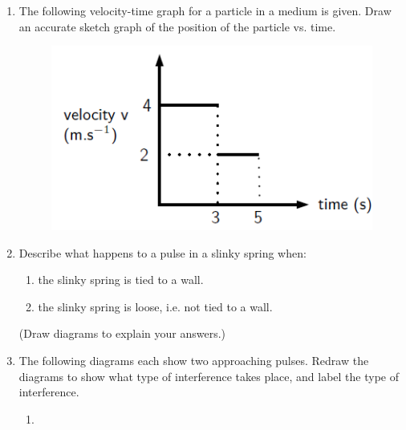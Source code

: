 \begin{enumerate}[noitemsep, label=\textbf{\arabic*}. ]
\begin{figure}[H]
\begin{center}
      \vspace{2pt}
    \vspace{.1in}
    \end{center}
 \end{figure}               \label{m38802*uid75}\item The following velocity-time graph for a particle in a medium is given. Draw an accurate sketch graph of the position of the particle vs. time.
    \setcounter{subfigure}{0}
	\begin{figure}[H] %
    \begin{center}
    \label{m38802*id316826!!!underscore!!!media}\label{m38802*id316826!!!underscore!!!printimage}\includegraphics[width=0.5\columnwidth]{col11305.imgs/m38802_PG10C4_031.png} %
      \vspace{2pt}
    \vspace{.1in}
    \end{center}
 \end{figure}               \label{m38802*uid76}\item Describe what happens to a pulse in a slinky spring when:
\label{m38802*id316845}\begin{enumerate}[noitemsep, label=\textbf{\alph*}. ] 
            \label{m38802*uid77}\item the slinky spring is tied to a wall.
\label{m38802*uid78}\item the slinky spring is loose, i.e. not tied to a wall.
\end{enumerate}
(Draw diagrams to explain your answers.)\newline
\label{m38802*uid79}\item The following diagrams each show two approaching pulses. Redraw the diagrams to show what type of interference takes place, and label the type of interference.
\label{m38802*id316891}\begin{enumerate}[noitemsep, label=\textbf{\alph*}. ] 
            \label{m38802*uid80}\item 
    \setcounter{subfigure}{0}
	\begin{figure}[H] %

\end{figure}
\end{enumerate}
\end{enumerate}
